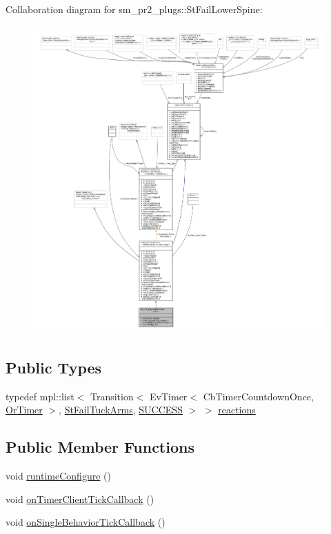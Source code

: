 Collaboration diagram for sm\+\_\+pr2\+\_\+plugs\+:\+:St\+Fail\+Lower\+Spine\+:
\nopagebreak
\begin{figure}[H]
\begin{center}
\leavevmode
\includegraphics[width=350pt]{structsm__pr2__plugs_1_1StFailLowerSpine__coll__graph}
\end{center}
\end{figure}
\subsection*{Public Types}
\begin{DoxyCompactItemize}
\item 
typedef mpl\+::list$<$ Transition$<$ Ev\+Timer$<$ Cb\+Timer\+Countdown\+Once, \hyperlink{classsm__pr2__plugs_1_1OrTimer}{Or\+Timer} $>$, \hyperlink{structsm__pr2__plugs_1_1StFailTuckArms}{St\+Fail\+Tuck\+Arms}, \hyperlink{classSUCCESS}{S\+U\+C\+C\+E\+SS} $>$ $>$ \hyperlink{structsm__pr2__plugs_1_1StFailLowerSpine_a84201506710211472a927aaaf1fbffd4}{reactions}
\end{DoxyCompactItemize}
\subsection*{Public Member Functions}
\begin{DoxyCompactItemize}
\item 
void \hyperlink{structsm__pr2__plugs_1_1StFailLowerSpine_af368b88521b53cb5b46dc68a2dffa036}{runtime\+Configure} ()
\item 
void \hyperlink{structsm__pr2__plugs_1_1StFailLowerSpine_add90ff06e4fa2743017927b67e274c95}{on\+Timer\+Client\+Tick\+Callback} ()
\item 
void \hyperlink{structsm__pr2__plugs_1_1StFailLowerSpine_aff67cab227312476a56bb92261d88e3b}{on\+Single\+Behavior\+Tick\+Callback} ()
\end{DoxyCompactItemize}
